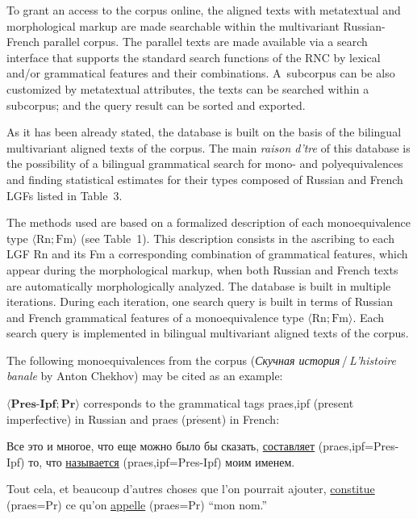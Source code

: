 \begin{multicols}{2}
   To grant an access to the corpus online, the aligned texts with metatextual and morphological 
markup are made searchable within the multivariant Russian-French parallel corpus. The parallel 
texts are made available via a search interface that supports the standard search functions of the 
RNC by lexical and/or grammatical features and their combinations. A~subcorpus can be also 
customized by metatextual attributes, the texts can be searched within a subcorpus; 
and the query result can be sorted and exported.
   
   As it has been already stated, the database is built on the basis of the bilingual multivariant 
aligned texts of the corpus. The main \textit{raison d'{\!}tre} of this database is the 
possibility of a bilingual grammatical search for mono- and polyequivalences and finding statistical 
estimates for their types composed of Russian and French LGFs listed in Table~3.





   The methods used are based on a formalized description of each monoequivalence type 
$\langle \mathrm{Rn}; \mathrm{Fm}\rangle$ (see Table~1). This description consists in the 
ascribing to each LGF Rn 
and its Fm a corresponding combination of grammatical features, which appear during the 
morphological markup, when both Russian and French texts are automatically morphologically 
analyzed. The database is built in multiple iterations. During each iteration,
one search query is built 
in terms of Russian and French grammatical features of a monoequivalence type $\langle \mathrm{Rn}; 
\mathrm{Fm}\rangle$. Each search query is implemented in bilingual multivariant aligned texts of the corpus.
   
   The following monoequivalences from the corpus (\textit{Скучная 
история}\,/\,\textit{L'histoire banale} by Anton Chekhov) may be cited as an example:
   
   $\langle\mathbf{Pres}\mbox{-}\mathbf{Ipf;Pr}\rangle$ corresponds to the grammatical tags 
praes,ipf (present imperfective) in Russian and praes (pr$\acute{\mbox{e}}$sent) in French:
   
Все это и многое, что еще можно было бы сказать, \underline{составляет} 
(praes,ipf\;=\;Pres-Ipf) то, что 
\underline{называется} (praes,ipf\;=\;Pres-Ipf) моим именем.

Tout cela, et beaucoup d'autres choses que l'on pourrait ajouter, \underline{constitue}
(praes\;=\;Pr) ce qu'on 
\underline{appelle} (praes\;=\;Pr) ``mon nom.''


\end{multicols}
